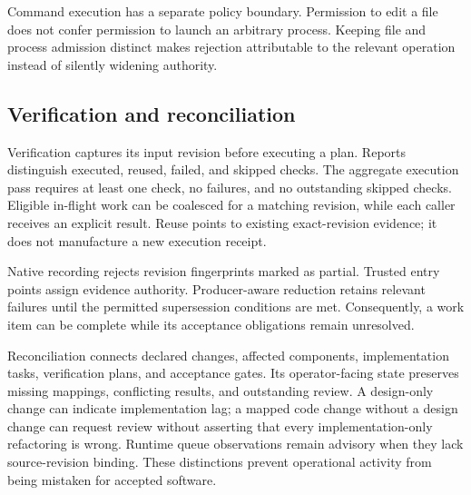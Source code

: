 Command execution has a separate policy boundary. Permission to edit a file does not confer permission to launch an arbitrary process. Keeping file and process admission distinct makes rejection attributable to the relevant operation instead of silently widening authority.

\subsection{Verification and reconciliation}
Verification captures its input revision before executing a plan. Reports distinguish executed, reused, failed, and skipped checks. The aggregate execution pass requires at least one check, no failures, and no outstanding skipped checks. Eligible in-flight work can be coalesced for a matching revision, while each caller receives an explicit result. Reuse points to existing exact-revision evidence; it does not manufacture a new execution receipt.

Native recording rejects revision fingerprints marked as partial. Trusted entry points assign evidence authority. Producer-aware reduction retains relevant failures until the permitted supersession conditions are met. Consequently, a work item can be complete while its acceptance obligations remain unresolved.

Reconciliation connects declared changes, affected components, implementation tasks, verification plans, and acceptance gates. Its operator-facing state preserves missing mappings, conflicting results, and outstanding review. A design-only change can indicate implementation lag; a mapped code change without a design change can request review without asserting that every implementation-only refactoring is wrong. Runtime queue observations remain advisory when they lack source-revision binding. These distinctions prevent operational activity from being mistaken for accepted software.

